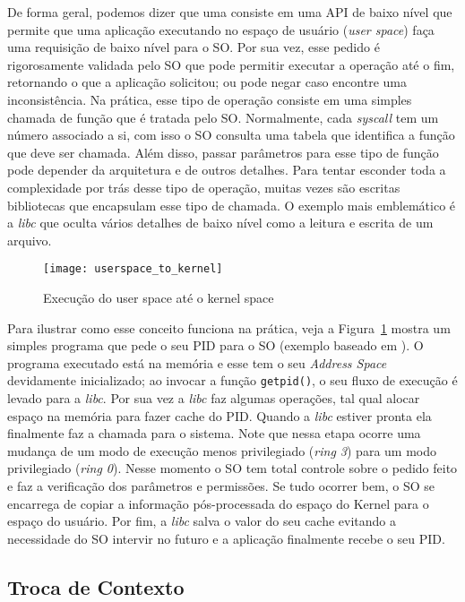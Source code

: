 De forma geral, podemos dizer que uma 
consiste em uma API de baixo nível que permite que uma aplicação executando no
espaço de usuário (\emph{user space}) faça uma requisição de baixo nível para o
SO. Por sua vez, esse pedido é rigorosamente validada pelo SO que pode permitir
executar a operação até o fim, retornando o que a aplicação solicitou; ou pode
negar caso encontre uma inconsistência. Na prática, esse tipo de operação
consiste em uma simples chamada de função que é tratada pelo SO. Normalmente,
cada \emph{syscall} tem um número associado a si, com isso o SO consulta uma
tabela que identifica a função que deve ser chamada. Além disso, passar
parâmetros para esse tipo de função pode depender da arquitetura e de outros
detalhes. Para tentar esconder toda a complexidade por trás desse tipo de
operação, muitas vezes são escritas bibliotecas que encapsulam esse tipo de
chamada. O exemplo mais emblemático é a \emph{libc} que oculta vários detalhes
de baixo nível como a leitura e escrita de um arquivo.

\begin{figure}[!h]
  \centering
  \texttt{[image: userspace\_to\_kernel]} 
  \caption{Execução do user space até o kernel space}
  \label{fig:userspace_kernelspace}
\end{figure}

Para ilustrar como esse conceito funciona na prática, veja a
Figura~\ref{fig:userspace_kernelspace} mostra um simples programa que pede o
seu PID para o SO (exemplo baseado em \cite{syscallex}). O programa executado
está na memória e esse tem o seu \emph{Address Space} devidamente inicializado;
ao invocar a função \texttt{getpid()}, o seu fluxo de execução é levado para a
\emph{libc}. Por sua vez a \emph{libc} faz algumas operações, tal qual alocar
espaço na memória para fazer cache do PID. Quando a \emph{libc} estiver pronta
ela finalmente faz a chamada para o sistema. Note que nessa etapa ocorre uma
mudança de um modo de execução menos privilegiado (\emph{ring 3}) para um modo
privilegiado (\emph{ring 0}). Nesse momento o SO tem total controle sobre o
pedido feito e faz a verificação dos parâmetros e permissões. Se tudo ocorrer
bem, o SO se encarrega de copiar a informação pós-processada do espaço do
Kernel para o espaço do usuário. Por fim, a \emph{libc} salva o valor do seu
cache evitando a necessidade do SO intervir no futuro e a aplicação finalmente
recebe o seu PID.

\subsection{Troca de Contexto}

